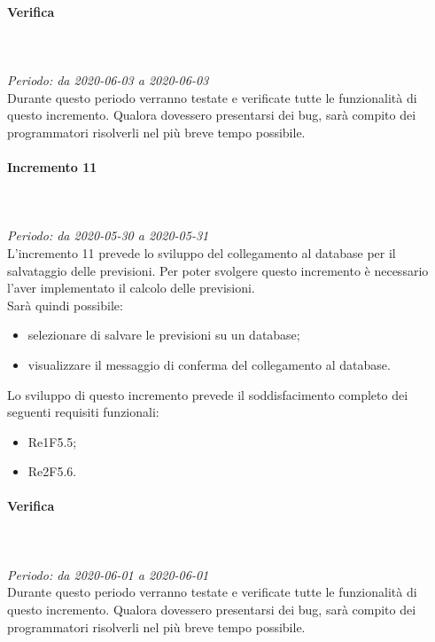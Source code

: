 \paragraph*{Verifica}\mbox{} \\ \mbox{} \\ 
\textit{Periodo: da 2020-06-03 a 2020-06-03}\\
Durante questo periodo verranno testate e verificate tutte le funzionalità di questo incremento. Qualora dovessero presentarsi dei bug, sarà compito dei programmatori risolverli nel più breve tempo possibile.

\paragraph{Incremento 11}\mbox{} \\ \mbox{} \\ 
\textit{Periodo: da 2020-05-30 a 2020-05-31}\\
L’incremento 11 prevede lo sviluppo del collegamento al database per il salvataggio delle previsioni. Per poter svolgere questo incremento è necessario l'aver implementato il calcolo delle previsioni. \\
Sarà quindi possibile:
\begin{itemize}
	\item selezionare di salvare le previsioni su un database;
	\item visualizzare il messaggio di conferma del collegamento al database.
\end{itemize}
Lo sviluppo di questo incremento prevede il soddisfacimento completo dei seguenti requisiti funzionali:
\begin{itemize}
\item Re1F5.5;
\item Re2F5.6.
\end{itemize}
\paragraph*{Verifica}\mbox{} \\ \mbox{} \\ 
\textit{Periodo: da 2020-06-01 a 2020-06-01}\\
Durante questo periodo verranno testate e verificate tutte le funzionalità di questo incremento. Qualora dovessero presentarsi dei bug, sarà compito dei programmatori risolverli nel più breve tempo possibile.

